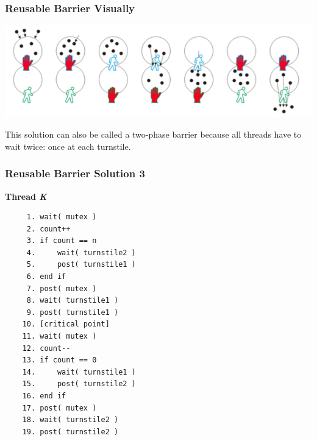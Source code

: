 \begin{frame}
	\frametitle{Reusable Barrier Visually}

	\begin{center}
		\includegraphics[width=\textwidth]{images/reusable-barrier.png}
	\end{center}

	This solution can also be called a \alert{two-phase barrier} because all threads have to wait twice: once at each turnstile.

\end{frame}

\begin{frame}[fragile]
	\frametitle{Reusable Barrier Solution 3}
	\vspace{-0.5em}
	\textbf{Thread \textit{K}}\vspace{-0.5em}
	\begin{verbatim}
	 1. wait( mutex )
	 2. count++
	 3. if count == n
	 4.     wait( turnstile2 )
	 5.     post( turnstile1 )
	 6. end if
	 7. post( mutex )
	 8. wait( turnstile1 )
	 9. post( turnstile1 )
	10. [critical point]
	11. wait( mutex )
	12. count--
	13. if count == 0
	14.     wait( turnstile1 )
	15.     post( turnstile2 )
	16. end if
	17. post( mutex )
	18. wait( turnstile2 )
	19. post( turnstile2 )
  \end{verbatim}
	\vspace{-2em}


\end{frame}




